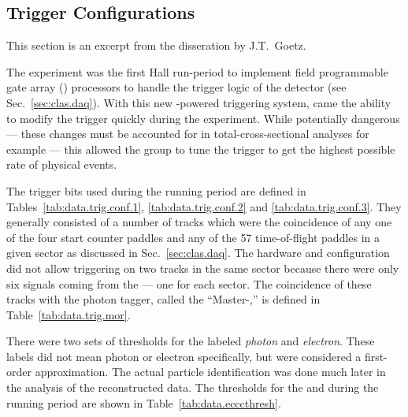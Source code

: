 \subsection{\label{sec:summary.trigger}Trigger Configurations}

\begin{center} \color{OliveGreen}
This section is an excerpt from the disseration by J.T.\ Goetz\cite{clas.thesis.goetz}.
\end{center}

The  experiment was the first Hall  run-period to implement field programmable gate array () processors to handle the trigger logic of the  detector (see Sec.~\ref{sec:clas.daq}). With this new -powered triggering system, came the ability to modify the trigger quickly during the experiment. While potentially dangerous --- these changes must be accounted for in total-cross-sectional analyses for example --- this allowed the group to tune the trigger to get the highest possible rate of physical events.

The trigger bits used during the  running period are defined in Tables~\ref{tab:data.trig.conf.1}, \ref{tab:data.trig.conf.2} and \ref{tab:data.trig.conf.3}. They generally consisted of a number of tracks which were the coincidence of any one of the four start counter paddles and any of the 57 time-of-flight paddles in a given sector as discussed in Sec.~\ref{sec:clas.daq}. The hardware and configuration did not allow triggering on two tracks in the same sector because there were only six signals coming from the  --- one for each sector. The coincidence of these tracks with the photon tagger, called the ``Master-,'' is defined in Table~\ref{tab:data.trig.mor}.





There were two sets of thresholds for the  labeled \emph{photon} and \emph{electron}. These labels did not mean photon or electron specifically, but were considered a first-order approximation. The actual particle identification was done much later in the analysis of the reconstructed data. The thresholds for the  and  during the  running period are shown in Table~\ref{tab:data.ecccthresh}.

